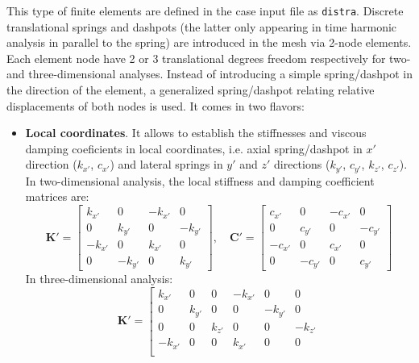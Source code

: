 \documentclass[a4paper,fleqn]{book}
\begin{document}
This type of finite elements are defined in the case input file as \texttt{distra}. Discrete translational springs and dashpots (the latter only appearing in time harmonic analysis in parallel to the spring) are introduced in the mesh via 2-node elements. Each element node have 2 or 3 translational degrees freedom respectively for two- and three-dimensional analyses. Instead of introducing a simple spring/dashpot in the direction of the element, a generalized spring/dashpot relating relative displacements of both nodes is used. It comes in two flavors:
\begin{itemize}
    \item \textbf{Local coordinates}. It allows to establish the stiffnesses and viscous damping coeficients in local coordinates, i.e. axial spring/dashpot in $x'$ direction ($k_{x'}$, $c_{x'}$) and lateral springs in $y'$ and $z'$ directions ($k_{y'}$, $c_{y'}$, $k_{z'}$, $c_{z'}$). In two-dimensional analysis, the local stiffness and damping coefficient matrices are:
    \begin{equation}
    \mathbf{K}'
    =
    \left[
    \begin{array}{cccc}
    k_{x'} & 0      & -k_{x'} &       0 \\
    0      & k_{y'} &       0 & -k_{y'} \\
    -k_{x'} &  0    & k_{x'} &      0 \\
        0 & -k_{y'} &      0 & k_{y'}
    \end{array}
    \right],
    \quad
    \mathbf{C}'
    =
    \left[
    \begin{array}{cccc}
    c_{x'} & 0      & -c_{x'} &       0 \\
    0      & c_{y'} &       0 & -c_{y'} \\
    -c_{x'} &  0    & c_{x'} &      0 \\
        0 & -c_{y'} &      0 & c_{y'}
    \end{array}
    \right]
    \end{equation}
    In three-dimensional analysis:
    \begin{equation}
    \mathbf{K}'
    =
    \left[
    \begin{array}{cccccc}
    k_{x'} & 0      & 0      & -k_{x'} &       0 & 0 \\
    0      & k_{y'} & 0      &       0 & -k_{y'} & 0 \\
    0      & 0      & k_{z'} &       0 &       0 & -k_{z'} \\
    -k_{x'} &       0 & 0       & k_{x'} &      0 & 0 \\

\end{array}
\end{equation}
\end{itemize}
\end{document}
